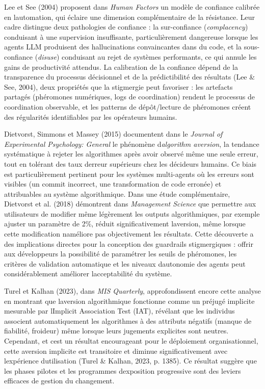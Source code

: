\documentclass[12pt,a4paper]{article}
\begin{document}
Lee et See (2004) proposent dans \emph{Human Factors} un modèle de
confiance calibrée en l\textquotesingle automation, qui éclaire une
dimension complémentaire de la résistance. Leur cadre distingue deux
pathologies de confiance : la sur-confiance (\emph{complacency})
conduisant à une supervision insuffisante, particulièrement
dangereuse lorsque les agents LLM produisent des hallucinations
convaincantes dans du code, et la sous-confiance (\emph{disuse})
conduisant au rejet de systèmes performants, ce qui annule les gains de
productivité attendus. La calibration de la confiance dépend de la
transparence du processus décisionnel et de la prédictibilité des
résultats (Lee \& See, 2004), deux propriétés que la stigmergie peut
favoriser : les artefacts partagés (phéromones numériques, logs de
coordination) rendent le processus de coordination observable, et les
patterns de dépôt/lecture de phéromones créent des régularités
identifiables par les opérateurs humains.

Dietvorst, Simmons et Massey (2015) documentent dans le \emph{Journal of
Experimental Psychology: General} le phénomène
d\textquotesingle{}\emph{algorithm aversion}, la tendance
systématique à rejeter les algorithmes après avoir observé même une
seule erreur, tout en tolérant des taux d\textquotesingle erreur
supérieurs chez les décideurs humains. Ce biais est particulièrement
pertinent pour les systèmes multi-agents où les erreurs sont visibles
(un commit incorrect, une transformation de code erronée) et
attribuables au système algorithmique. Dans une étude complémentaire,
Dietvorst et al. (2018) démontrent dans \emph{Management Science} que
permettre aux utilisateurs de modifier même légèrement les outputs
algorithmiques, par exemple ajuster un paramètre de 2\%, réduit
significativement l\textquotesingle aversion, même lorsque cette
modification n\textquotesingle améliore pas objectivement les résultats.
Cette découverte a des implications directes pour la conception des
guardrails stigmergiques : offrir aux développeurs la possibilité de
paramétrer les seuils de phéromones, les critères de validation
automatique et les niveaux d\textquotesingle autonomie des agents peut
considérablement améliorer l\textquotesingle acceptabilité du système.

Turel et Kalhan (2023), dans \emph{MIS Quarterly}, approfondissent
encore cette analyse en montrant que l\textquotesingle aversion
algorithmique fonctionne comme un préjugé implicite mesurable par
l\textquotesingle Implicit Association Test (IAT), révélant que les
individus associent automatiquement les algorithmes à des attributs
négatifs (manque de fiabilité, froideur) même lorsque leurs jugements
explicites sont neutres. Cependant, et c\textquotesingle est un résultat
encourageant pour le déploiement organisationnel, cette aversion
implicite est transitoire et diminue significativement avec
l\textquotesingle expérience d\textquotesingle utilisation (Turel \&
Kalhan, 2023, p. 1385). Ce résultat suggère que les phases pilotes et
les programmes d\textquotesingle exposition progressive sont des leviers
efficaces de gestion du changement.
\end{document}
